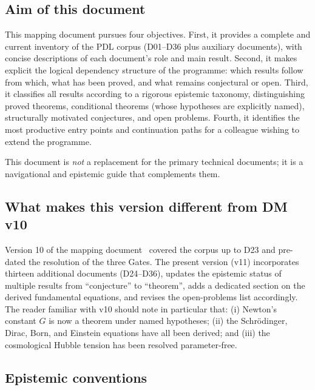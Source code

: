 \documentclass[11pt,a4paper]{article}
\theoremstyle{plain}
\theoremstyle{definition}
\theoremstyle{remark}
\begin{document}
\subsection{Aim of this document}
\label{subsec:aim}

This mapping document pursues four objectives.
First, it provides a complete and current inventory of the PDL corpus (D01--D36 plus auxiliary documents), with concise descriptions of each document's role and main result.
Second, it makes explicit the logical dependency structure of the programme: which results follow from which, what has been proved, and what remains conjectural or open.
Third, it classifies all results according to a rigorous epistemic taxonomy, distinguishing proved theorems, conditional theorems (whose hypotheses are explicitly named), structurally motivated conjectures, and open problems.
Fourth, it identifies the most productive entry points and continuation paths for a colleague wishing to extend the programme.

This document is \emph{not} a replacement for the primary technical documents; it is a navigational and epistemic guide that complements them.

\subsection{What makes this version different from DM v10}
\label{subsec:diff_v10}

Version 10 of the mapping document~\citep{D_Map_v10} covered the corpus up to D23 and pre-dated the resolution of the three Gates.
The present version (v11) incorporates thirteen additional documents (D24--D36), updates the epistemic status of multiple results from ``conjecture'' to ``theorem'', adds a dedicated section on the derived fundamental equations, and revises the open-problems list accordingly.
The reader familiar with v10 should note in particular that: (i) Newton's constant $G$ is now a theorem under named hypotheses; (ii) the Schr\"odinger, Dirac, Born, and Einstein equations have all been derived; and (iii) the cosmological Hubble tension has been resolved parameter-free.

\subsection{Epistemic conventions}
\label{subsec:conventions}
\end{document}
